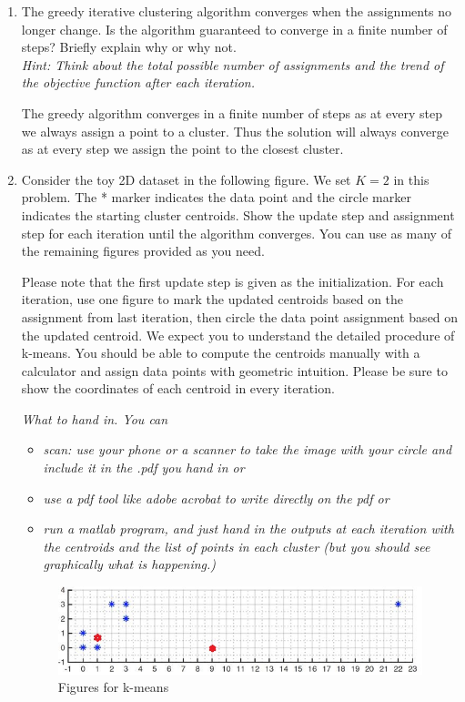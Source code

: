   \begin{enumerate}
\item {} The greedy iterative clustering algorithm converges when the assignments no longer change. Is the algorithm guaranteed to converge in a finite number of steps? Briefly explain why or why not.\\
{\em Hint: Think about the total possible number of assignments and the trend of the objective function after each iteration.}

The greedy algorithm converges in a finite number of steps as at every step we always assign a point to a cluster.
Thus the solution will always converge as at every step we assign the point to the closest cluster.\\


\item {} Consider the toy 2D dataset in the following
  figure. We set $K = 2$ in this problem. The * marker indicates the
  data point and the circle marker indicates the starting cluster
  centroids. Show the update step and assignment step for each
  iteration until the algorithm converges. You can use as many of the 
  remaining figures provided as you need.

Please note that the first update step is given as the
initialization. For each iteration, use one figure to mark the updated
centroids based on the assignment from last iteration, then circle the
data point assignment based on the updated centroid. We expect you to
understand the detailed procedure of k-means. You should be able to
compute the centroids manually with a calculator and assign data
points with geometric intuition. Please be sure to show the
coordinates of each centroid in every iteration.

{\em What to hand in.  You can }
\begin{itemize}
\item {\em scan: use your phone or a scanner to take the image with your circle
and include it in the .pdf you hand in or}
\item {\em use a pdf tool like adobe acrobat to write directly on the pdf or }
\item {\em run a matlab program, and just hand in the outputs at each iteration with the centroids and the list of
    points in each cluster (but you should see graphically what is happening.)}
\end{itemize}

\begin{figure}[H]
  \centering
  \includegraphics[scale=0.8]{images/4_2_1}
  \caption{Figures for k-means}\label{fig:kmeans}
\end{figure}


\end{enumerate}
